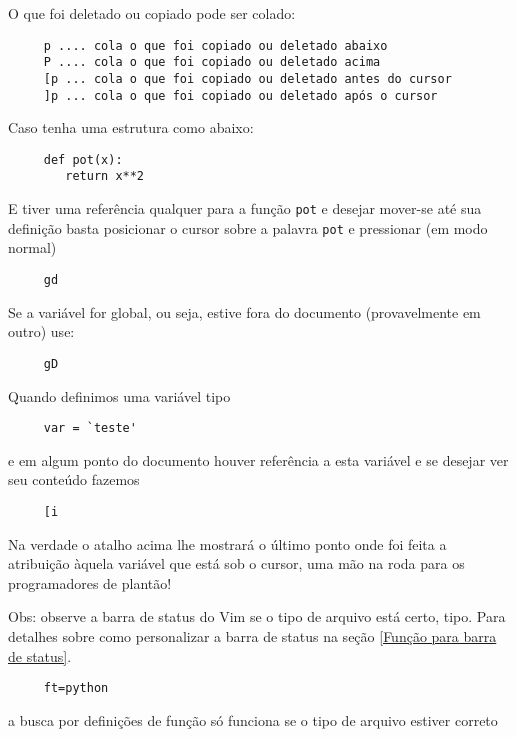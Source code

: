 O que foi deletado ou copiado pode ser colado:

\begin{verbatim}
     p .... cola o que foi copiado ou deletado abaixo
     P .... cola o que foi copiado ou deletado acima
     [p ... cola o que foi copiado ou deletado antes do cursor
     ]p ... cola o que foi copiado ou deletado após o cursor
\end{verbatim}

Caso tenha uma estrutura como abaixo:

\begin{verbatim}
     def pot(x):
        return x**2
\end{verbatim}

E tiver uma referência qualquer para a função \verb+pot+ e desejar
mover-se até sua definição basta posicionar o cursor sobre a palavra
\verb+pot+ e pressionar (em modo normal)

\begin{verbatim}
     gd
\end{verbatim}

Se a variável for global, ou seja, estive fora do documento
(provavelmente em outro) use:

\begin{verbatim}
     gD
\end{verbatim}

Quando definimos uma variável tipo

\begin{verbatim}
     var = `teste'
\end{verbatim}

e em algum ponto do documento houver referência a esta variável e se
desejar ver seu conteúdo fazemos

\begin{verbatim}
     [i
\end{verbatim}
Na verdade o atalho acima lhe mostrará o último ponto onde foi feita
a atribuição àquela variável que está sob o cursor, uma mão na roda
para os programadores de plantão!


Obs: observe a  barra de status do Vim se o tipo de arquivo está certo,
tipo. Para detalhes sobre como personalizar a barra de status na seção
\ref{Função para barra de status}.

\begin{verbatim}
     ft=python
\end{verbatim}

a busca por definições de função só funciona se o tipo de arquivo
estiver correto

